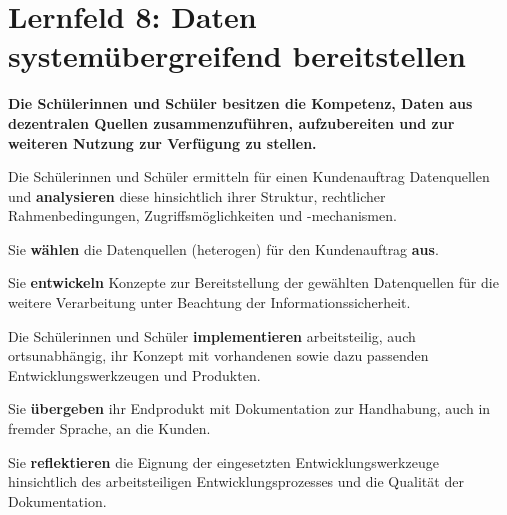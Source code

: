 \chapter{Lernfeld 8: Daten systemübergreifend bereitstellen}

\textbf{Die Schülerinnen und Schüler besitzen die Kompetenz, Daten aus dezentralen Quellen zusammenzuführen, aufzubereiten und zur weiteren Nutzung zur Verfügung zu
stellen.}

Die Schülerinnen und Schüler ermitteln für einen Kundenauftrag Datenquellen und \textbf{analysieren} diese hinsichtlich ihrer Struktur, rechtlicher Rahmenbedingungen, Zugriffsmöglichkeiten und -mechanismen.

Sie \textbf{wählen} die Datenquellen (heterogen) für den Kundenauftrag \textbf{aus}.

Sie \textbf{entwickeln} Konzepte zur Bereitstellung der gewählten Datenquellen für die weitere Verarbeitung unter Beachtung der Informationssicherheit.

Die Schülerinnen und Schüler \textbf{implementieren} arbeitsteilig, auch ortsunabhängig, ihr Konzept mit vorhandenen sowie dazu passenden Entwicklungswerkzeugen und Produkten.

Sie \textbf{übergeben} ihr Endprodukt mit Dokumentation zur Handhabung, auch in fremder Sprache, an die Kunden.

Sie \textbf{reflektieren} die Eignung der eingesetzten Entwicklungswerkzeuge hinsichtlich des arbeitsteiligen Entwicklungsprozesses und die Qualität der Dokumentation. 